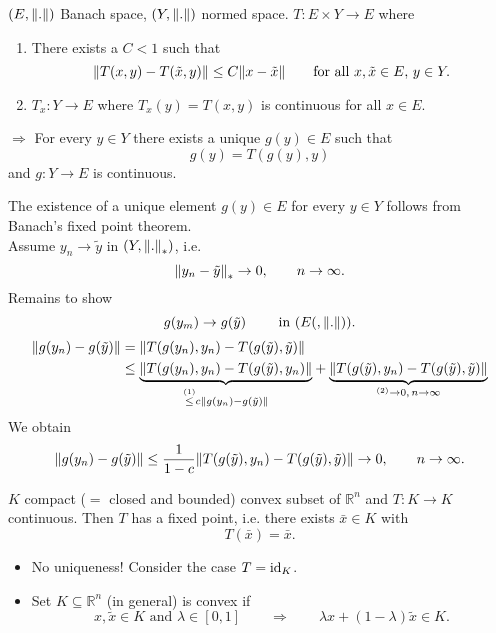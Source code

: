 


\begin{theorem}
	$(E,\norm{.})$ Banach space, $(Y,\norm{.})$ normed space. $T: E \times Y \to E$ where
	\begin{enumerate}[(1)]
		\item There exists a $C < 1$ such that
		\[
			\norm{T(x,y)-T(\tilde x,y)} \leq C \norm{x - \tilde x} \qquad \text{for all }x, \tilde x \in E,\, y \in Y.
		\]
		\item $T_x: Y \to E$ where $T_x(y)= T(x,y)$ is continuous for all $x \in E$.
	\end{enumerate}
	$\Rightarrow $ For every $y \in Y$ there exists a unique $g(y) \in E$ such that \[
		g(y)= T(g(y),y)
	\] and $g: Y \to E$ is continuous.
\end{theorem}
\begin{beweis}
	The existence of a unique element $g(y) \in E$ for every $y \in Y$ follows from Banach's fixed point theorem. \\
	Assume $y_n \to \tilde y$ in $(Y, \norm{.}_{*})$, i.e. \[
		\norm{y_n - \tilde y}_* \to 0, \qquad n \to \infty.
	\]
	Remains to show
	\[
		g(y_m) \to g(\tilde y) \qquad \text{ in }(E(,\norm{.})).
	\]
	\begin{align*}
		\norm{g(y_n)- g( \tilde y)} &= \norm{T(g(y_n),y_n) - T(g(\tilde y), \tilde y)} \\
		&\leq  \underset{ \stackrel{(1)}{\leq } c \norm{g(y_n)-g(\tilde y)}}{\underbrace{\norm{T(g(y_n),y_n) - T(g( \tilde y),y_n)}}} + 
		\underset{^{(2)}\to 0, \, n \to \infty}{\underbrace{\norm{T(g(\tilde y),y_n)- T(g(\tilde y),\tilde y)}}}
	\end{align*}
	We obtain
	\[
		\norm{g(y_n)-g(\tilde y)} \leq \frac{1}{1-c} \norm{T(g(\tilde y), y_n) - T(g(\tilde y),\tilde y)} \to 0, \qquad n \to \infty.
	\]
\end{beweis}

\begin{theorem}
	$K$ compact ($=$ closed and bounded) convex subset of $\mathbb{R}^n$ and $T: K \to K$ continuous. Then $T$ has a fixed point, i.e. there exists $\bar{x} \in K$ with
	\[
		T(\bar{x}) = \bar{x}.
	\]
\end{theorem}
\begin{bemerkung}
	\begin{itemize}
		\item No uniqueness! Consider the case $T= \operatorname{id}_K$.
		\item Set $K \subseteq \mathbb{R}^n$ (in general) is convex if
		\[
			x, \tilde x \in K \text{ and } \lambda \in [0,1] \qquad \Rightarrow \qquad \lambda x + ( 1- \lambda)\tilde x \in K.
		\]
	\end{itemize}
\end{bemerkung}

